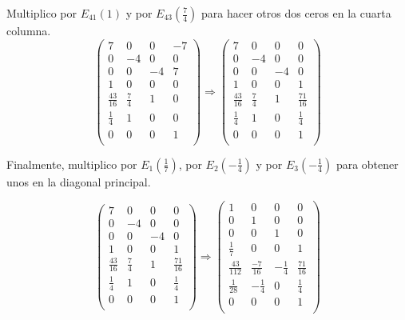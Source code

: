 \documentclass[11pt, a4paper]{article}
\newif\IfInSansMode
\theoremstyle{theorem-style}
\theoremstyle{definition-style}
\theoremstyle{remark-style}
\theoremstyle{example-style}
\begin{document}
Multiplico por $E_41(1)$ y por $E_43(\frac{7}{4})$ para hacer otros dos ceros en la cuarta columna. \\

$$\begin{pmatrix}
7 & 0 & 0 & -7\\
0 & -4 & 0 & 0\\
0 & 0 & -4 & 7\\
1 & 0 & 0 & 0\\
\frac{43}{16} & \frac{7}{4} & 1 & 0\\
\frac{1}{4} & 1 & 0 & 0\\
0 & 0 & 0 & 1\\
\end{pmatrix} \Longrightarrow
\begin{pmatrix}
7 & 0 & 0 & 0\\
0 & -4 & 0 & 0\\
0 & 0 & -4 & 0\\
1 & 0 & 0 & 1\\
\frac{43}{16} & \frac{7}{4} & 1 & \frac{71}{16}\\
\frac{1}{4} & 1 & 0 & \frac{1}{4}\\
0 & 0 & 0 & 1\\
\end{pmatrix}$$

Finalmente, multiplico por $E_1(\frac{1}{7})$, por $E_2(-\frac{1}{4})$ y por $E_3(-\frac{1}{4})$ para obtener unos en la diagonal principal.

$$\begin{pmatrix}
7 & 0 & 0 & 0\\
0 & -4 & 0 & 0\\
0 & 0 & -4 & 0\\
1 & 0 & 0 & 1\\
\frac{43}{16} & \frac{7}{4} & 1 & \frac{71}{16}\\
\frac{1}{4} & 1 & 0 & \frac{1}{4}\\
0 & 0 & 0 & 1\\
\end{pmatrix} \Longrightarrow
\begin{pmatrix}
1 & 0 & 0 & 0\\
0 & 1 & 0 & 0\\
0 & 0 & 1 & 0\\
\frac{1}{7} & 0 & 0 & 1\\
\frac{43}{112} & \frac{-7}{16} & -\frac{1}{4} & \frac{71}{16}\\
\frac{1}{28} & -\frac{1}{4} & 0 & \frac{1}{4}\\
0 & 0 & 0 & 1\\
\end{pmatrix}$$
\end{document}
